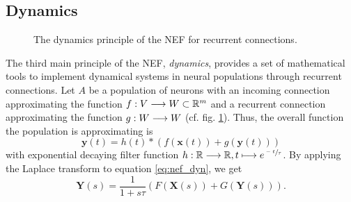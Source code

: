 \subsection{Dynamics}

\begin{figure}[t]
	\centering
{}
\caption{The dynamics principle of the \ac{NEF} for recurrent connections.}
\label{fig:nef_dynamics}
\end{figure}
The third main principle of the \ac{NEF}, \emph{dynamics}, provides a set of mathematical tools to implement dynamical systems in neural populations through recurrent connections.
Let $A$ be a population of neurons with an incoming connection approximating the function $f: V \longrightarrow W \subset \mathbb{R}^{m}$ and a recurrent connection approximating the function $g: W \longrightarrow W$ (cf. fig. \ref{fig:nef_dynamics}).
Thus, the overall function the population is approximating is
\begin{equation}
\mathbf{y}(t) = h(t) \ast \left(f(\mathbf{x}(t)) + g(\mathbf{y}(t))\right)
\label{eq:nef_dyn}
\end{equation}
with exponential decaying filter function $h: \mathbb{R} \longrightarrow \mathbb{R}, t \longmapsto e^{\sfrac{-t}{\tau}}$.
By applying the Laplace transform to equation \ref{eq:nef_dyn}, we get
\begin{equation}
\label{eq:nef_dyn_laplace}
\mathbf{Y}(s) = \frac{1}{1 + s\tau}\left(F(\mathbf{X}(s)) + G(\mathbf{Y}(s))\right).
\end{equation}

